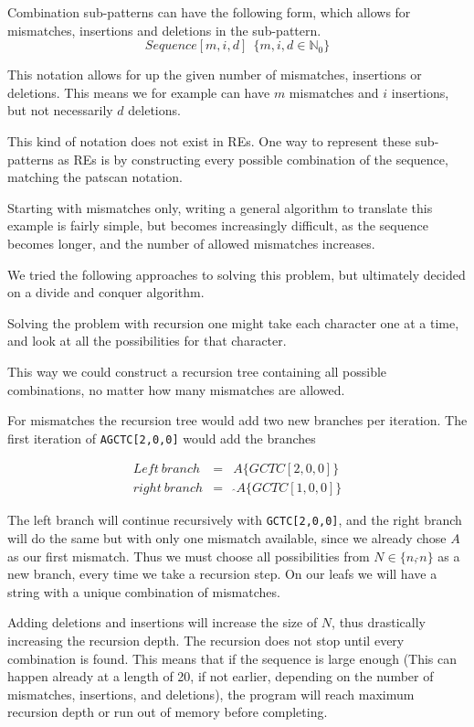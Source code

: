 \documentclass[12pt]{article}
\theoremstyle{definition}
\newcounter{subsubsubsection}[subsubsection]
\begin{document}
Combination sub-patterns can have the following form, which allows for mismatches, insertions and deletions in the sub-pattern. 
\begin{equation}
	Sequence[m, i, d] \ \ \{m, i, d \in \mathbb{N}_0 \}
\end{equation} 

This notation allows for up the given number of mismatches, insertions or deletions. This means we for example can have $m$ mismatches and $i$ insertions, but not necessarily $d$ deletions.

This kind of notation does not exist in REs. One way to represent these sub-patterns as REs is by constructing every possible combination of the sequence, matching the patscan notation.

Starting with mismatches only, writing a general algorithm to translate this example is fairly simple, but becomes increasingly difficult, as the sequence becomes longer, and the number of allowed mismatches increases.

We tried the following approaches to solving this problem, but ultimately decided on a divide and conquer algorithm. 


Solving the problem with recursion one might take each character one at a time, and look at all the possibilities for that character.

This way we could construct a recursion tree containing all possible combinations, no matter how many mismatches are allowed.

For mismatches the recursion tree would add two new branches per iteration. The first iteration of \texttt{AGCTC[2,0,0]} would add the branches

\begin{eqnarray}
	Left\ branch &=& A\{GCTC[2,0,0]\} \\
	right\ branch &=&\ \hat{}A\{GCTC[1,0,0]\}
\end{eqnarray}

The left branch will continue recursively with \texttt{GCTC[2,0,0]}, and the right branch will do the same but with only one mismatch available, since we already chose $A$ as our first mismatch. Thus we must choose all possibilities from $N \in \{n, \hat{}n\}$ as a new branch, every time we take a recursion step.
On our leafs we will have a string with a unique combination of mismatches.

Adding deletions and insertions will increase the size of $N$, thus drastically increasing the recursion depth. The recursion does not stop until every combination is found. This means that if the sequence is large enough (This can happen already at a length of 20, if not earlier, depending on the number of mismatches, insertions, and deletions), the program will reach maximum recursion depth or run out of memory before completing.
\end{document}

